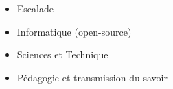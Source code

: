 \begin{itemize}
	\item Escalade
	\item Informatique (open-source)
	\item Sciences et Technique
	\item Pédagogie et transmission du savoir
\end{itemize}








%
%
%





